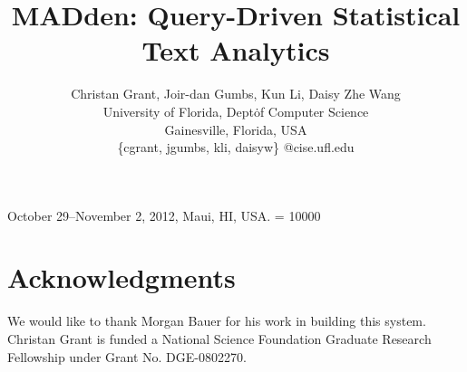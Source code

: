 \documentclass{sig-alt-release2}
\newcommand{\system}{MADden\xspace}
\begin{document}
 {October 29--November 2, 2012, Maui, HI, USA.} 
\widowpenalty = 10000


\title{\system: Query-Driven Statistical Text Analytics}


\author{Christan Grant, Joir-dan Gumbs, Kun Li, Daisy Zhe Wang \\
    University of Florida, Dept\. of Computer Science \\
    Gainesville, Florida, USA \\
    \{cgrant, jgumbs, kli, daisyw\} @cise.ufl.edu
}



\maketitle









%





%
\section{Acknowledgments}
We would like to thank Morgan Bauer for his work in building this system.
Christan Grant is funded a National Science Foundation Graduate Research 
Fellowship under Grant No. DGE-0802270.


\begin{small}

\end{small}
\end{document}
